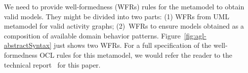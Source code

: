 We need to provide well-formedness (WFRs) rules for the metamodel to obtain valid \agl models. They might be divided into two parts: (1) WFRs from UML metamodel for valid activity graphs; (2)~WFRs to ensure \agl models obtained as a composition of available domain behavior patterns. Figure~\ref{fig:agl-abstractSyntax} just shows two WFRs. For a full specification of the well-formedness OCL rules for this metamodel, we would refer the reader to the technical report~\cite{dang2023aglTechReport} for this paper.

%
